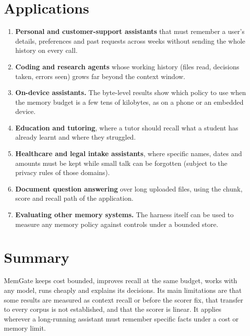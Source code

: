 \section{Applications}
\begin{enumerate}
\item \textbf{Personal and customer-support assistants} that must remember a
  user's details, preferences and past requests across weeks without sending
  the whole history on every call.
\item \textbf{Coding and research agents} whose working history (files read,
  decisions taken, errors seen) grows far beyond the context window.
\item \textbf{On-device assistants.} The byte-level results show which
  policy to use when the memory budget is a few tens of kilobytes, as on a
  phone or an embedded device.
\item \textbf{Education and tutoring}, where a tutor should recall what a
  student has already learnt and where they struggled.
\item \textbf{Healthcare and legal intake assistants}, where specific names,
  dates and amounts must be kept while small talk can be forgotten (subject to
  the privacy rules of those domains).
\item \textbf{Document question answering} over long uploaded files, using
  the chunk, score and recall path of the application.
\item \textbf{Evaluating other memory systems.} The harness itself can be
  used to measure any memory policy against controls under a bounded store.
\end{enumerate}

\section*{Summary}
MemGate keeps cost bounded, improves recall at the same budget, works with
any model, runs cheaply and explains its decisions. Its main limitations are
that some results are measured as context recall or before the scorer fix,
that transfer to every corpus is not established, and that the scorer is
linear. It applies wherever a long-running assistant must remember specific
facts under a cost or memory limit.
